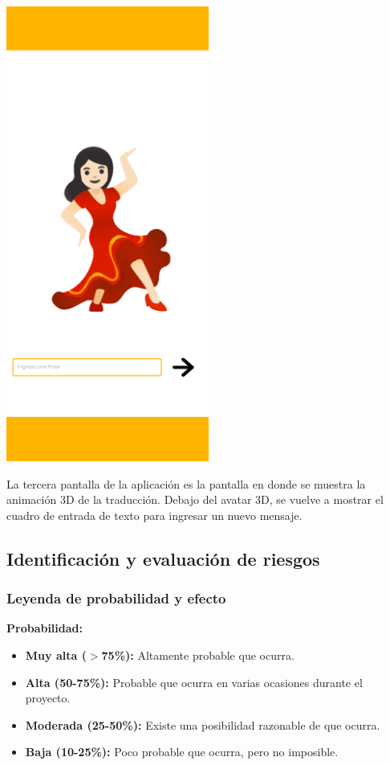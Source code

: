 \begin{center}
    \includegraphics[width=0.5\textwidth]{Images/Cap 3/Pantalla3.png}
\end{center}

La tercera pantalla de la aplicación es la pantalla en donde se muestra la animación 3D de la traducción. Debajo del avatar 3D, se vuelve a mostrar el cuadro de entrada de texto para ingresar un nuevo mensaje.

\subsection{Identificación y evaluación de riesgos}
\subsubsection{Leyenda de probabilidad y efecto}
\textbf{Probabilidad:}
\begin{itemize}
	\item \textbf{Muy alta ($>$75\%):} Altamente probable que ocurra.
	\item \textbf{Alta (50-75\%):} Probable que ocurra en varias ocasiones durante el proyecto.
	\item \textbf{Moderada (25-50\%):} Existe una posibilidad razonable de que ocurra.
	\item \textbf{Baja (10-25\%):} Poco probable que ocurra, pero no imposible.
\end{itemize}

